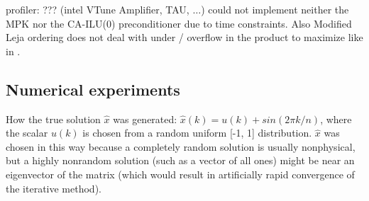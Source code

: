 \documentclass{scrartcl}
\begin{document}
 profiler: ??? (intel VTune Amplifier, TAU, $\ldots$) could not implement neither the MPK nor the CA-ILU(0) preconditioner due to time constraints. Also Modified Leja ordering does not deal with under / overflow in the product to maximize like in \cite{Hoemmen:2010:CKS:1970638}.
\subsection{Numerical experiments}

How the true solution $\hat{x}$ was generated: $\hat{x}(k) = u(k) + sin(2\pi k/n)$,
where the scalar $u(k)$ is chosen from a random uniform [-1, 1] distribution. 
$\hat{x}$ was chosen in this way because a completely random solution is usually nonphysical, but a highly nonrandom solution (such as a vector of all ones) might be near an eigenvector of the matrix (which would result in artificially rapid convergence of the iterative method).
\end{document}
